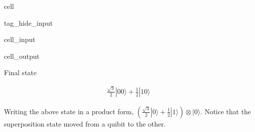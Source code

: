 \documentclass[letterpaper,10pt,english]{jupyterBook}
\begin{document}
\begin{sphinxuseclass}{cell}
\begin{sphinxuseclass}{tag_hide_input}\begin{sphinxVerbatimInput}

\begin{sphinxuseclass}{cell_input}
\begin{sphinxVerbatim}[commandchars=\\\{\}]
\end{sphinxVerbatim}

\end{sphinxuseclass}\end{sphinxVerbatimInput}
\begin{sphinxVerbatimOutput}

\begin{sphinxuseclass}{cell_output}
\begin{sphinxVerbatim}[commandchars=\\\{\}]
Final state
\end{sphinxVerbatim}
\begin{equation*}
\begin{split}\frac{\sqrt{3}}{2} |00\rangle+\frac{1}{2} |10\rangle\end{split}
\end{equation*}
\end{sphinxuseclass}\end{sphinxVerbatimOutput}

\end{sphinxuseclass}
\end{sphinxuseclass}
\sphinxAtStartPar
Writing the above state in a product form,  \(\left(\frac{\sqrt{3}}{2}|0\rangle + \frac{1}{2}|1\rangle\right) \otimes |0\rangle\).  Notice that the superposition state moved from a quibit to the other.
\end{document}

